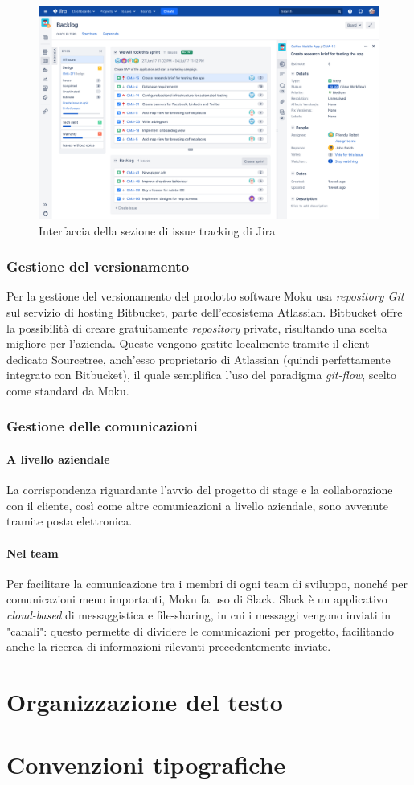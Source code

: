 \begin{figure}[h!]
    \includegraphics[width=\textwidth]{figures/Jira.png}
    \caption[Jira]{Interfaccia della sezione di issue tracking di Jira
    \label{fig:Jira}}
\end{figure}    

\subsubsection{Gestione del versionamento}
Per la gestione del versionamento del prodotto software Moku usa \textit{repository Git} sul servizio di hosting Bitbucket, parte dell'ecosistema Atlassian. Bitbucket offre la possibilità di creare gratuitamente \textit{repository} private, risultando una scelta migliore per l'azienda. Queste vengono gestite localmente tramite il client dedicato Sourcetree, anch'esso proprietario di Atlassian (quindi perfettamente integrato con Bitbucket), il quale semplifica l'uso del paradigma \textit{git-flow}, scelto come standard da Moku.

\subsubsection{Gestione delle comunicazioni}
\paragraph{A livello aziendale} La corrispondenza riguardante l'avvio del progetto di stage e la collaborazione con il cliente, così come altre comunicazioni a livello aziendale, sono avvenute tramite posta elettronica.
\paragraph{Nel team} Per facilitare la comunicazione tra i membri di ogni team di sviluppo, nonché per comunicazioni meno importanti, Moku fa uso di Slack. Slack è un applicativo \textit{cloud-based} di messaggistica e file-sharing, in cui i messaggi vengono inviati in "canali": questo permette di dividere le comunicazioni per progetto, facilitando anche la ricerca di informazioni rilevanti precedentemente inviate.

\section{Organizzazione del testo}

\section{Convenzioni tipografiche}
